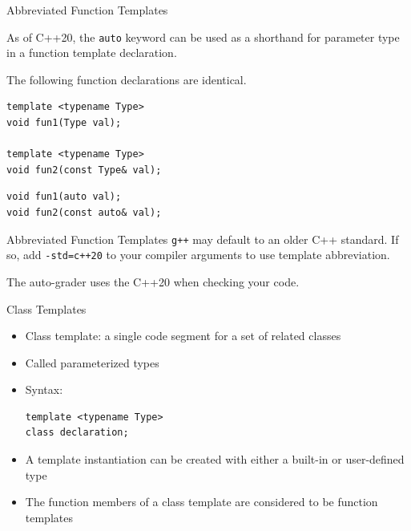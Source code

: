 \documentclass[14pt,aspectratio=1610, hyperref={pdfpagelayout=SinglePage}]{beamer}
\begin{document}
\begin{frame}[fragile]{Abbreviated Function Templates}

As of C++20, the \lstinline{auto} keyword can be used as a shorthand for parameter type in a function template declaration.

The following function declarations are identical.

\begin{lstlisting}
template <typename Type>
void fun1(Type val);

template <typename Type>
void fun2(const Type& val);
\end{lstlisting}

\begin{lstlisting}
void fun1(auto val);
void fun2(const auto& val);
\end{lstlisting}
\end{frame}

\begin{frame}{Abbreviated Function Templates}
\texttt{g++} may default to an older C++ standard. If so, add \lstinline[language=Bash, identifierstyle=\color{white}]{-std=c++20} to your compiler arguments to use template abbreviation.

The auto-grader uses the C++20 when checking your code.
\end{frame}

\begin{frame}[fragile]{Class Templates}
\protect\hypertarget{class-templates}{}
\begin{itemize}
\item
  Class template: a single code segment for a set of related classes
\item
  Called parameterized types
\item
  Syntax:
\begin{lstlisting}
template <typename Type>
class declaration;
\end{lstlisting}
\item
  A template instantiation can be created with either a built-in or
  user-defined type
\item
  The function members of a class template are considered to be function
  templates
\end{itemize}
\end{frame}
\end{document}
